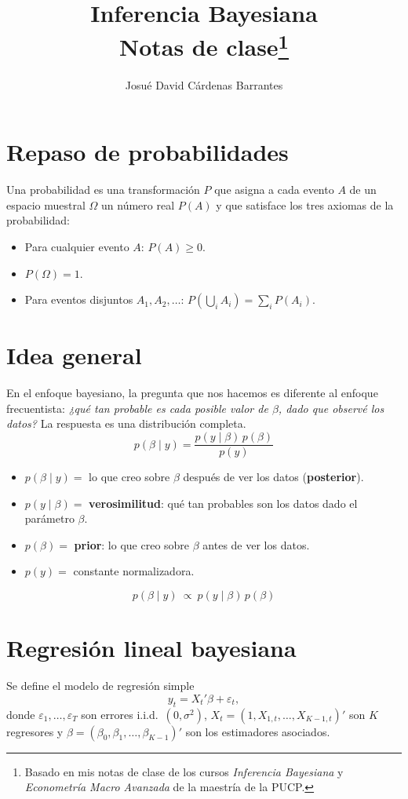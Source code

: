\documentclass[11pt]{article}
\title{\textbf{Inferencia Bayesiana}\\[2pt]\large Notas de clase\footnote{Basado en mis notas de clase de los cursos \emph{Inferencia Bayesiana} y \emph{Econometría Macro Avanzada} de la maestría de la PUCP.}}
\author{Josué David Cárdenas Barrantes}
\date{}
\theoremstyle{definition}
\begin{document}
\maketitle
\tableofcontents
\newpage

\section{Repaso de probabilidades}
Una probabilidad es una transformación $P$ que asigna a cada evento $A$ de un espacio muestral $\Omega$ un número real $P(A)$ y que satisface los tres axiomas de la probabilidad:
\begin{itemize}[leftmargin=2em]
  \item[\textbf{A1}] Para cualquier evento $A$: $P(A)\ge 0$.
  \item[\textbf{A2}] $P(\Omega)=1$.
  \item[\textbf{A3}] Para eventos disjuntos $A_1,A_2,\dots$: $P\!\left(\bigcup_i A_i\right)=\sum_i P(A_i)$.
\end{itemize}

\section{Idea general}
En el enfoque bayesiano, la pregunta que nos hacemos es diferente al enfoque frecuentista: \emph{¿qué tan probable es cada posible valor de $\beta$, dado que observé los datos?} La respuesta es una distribución completa.
\[
p(\beta\mid y)=\frac{p(y\mid\beta)\,p(\beta)}{p(y)}
\]
\begin{itemize}[leftmargin=2em]
  \item $p(\beta\mid y)=$ lo que creo sobre $\beta$ después de ver los datos (\textbf{posterior}).
  \item $p(y\mid\beta)=$ \textbf{verosimilitud}: qué tan probables son los datos dado el parámetro $\beta$.
  \item $p(\beta)=$ \textbf{prior}: lo que creo sobre $\beta$ antes de ver los datos.
  \item $p(y)=$ constante normalizadora.
\end{itemize}
\[
p(\beta\mid y)\ \propto\ p(y\mid\beta)\,p(\beta)
\]

\section{Regresión lineal bayesiana}
Se define el modelo de regresión simple
\[
y_t = X_t'\beta+\varepsilon_t,
\]
donde $\varepsilon_1,\dots,\varepsilon_T$ son errores i.i.d.\ $(0,\sigma^2)$, $X_t=(1,X_{1,t},\dots,X_{K-1,t})'$ son $K$ regresores y $\beta=(\beta_0,\beta_1,\dots,\beta_{K-1})'$ son los estimadores asociados.
\end{document}
